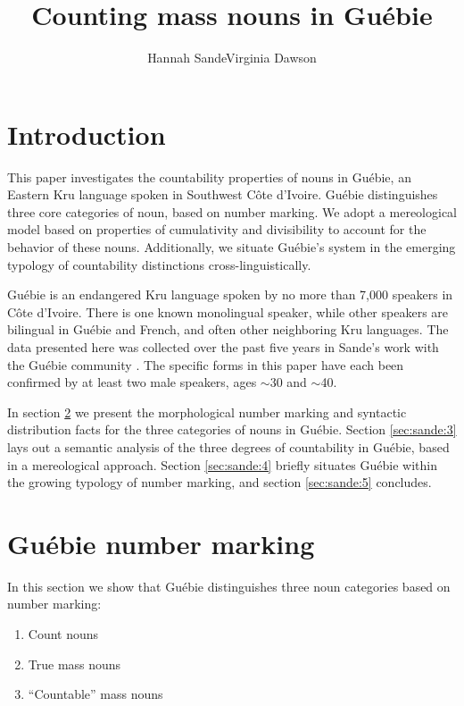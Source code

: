 \documentclass[output=paper,colorlinks,citecolor=brown]{langscibook}
\title{Counting mass nouns in Guébie}
\author{Hannah Sande\affiliation{Georgetown University}\lastand Virginia Dawson\affiliation{University of California, Berkeley}}
\begin{document}
\maketitle 

\section{Introduction}\label{sec:sande:1}

This paper investigates the countability properties of nouns in Guébie, an Eastern Kru language spoken in Southwest Côte d'Ivoire. Guébie distinguishes three core categories of noun, based on number marking. We adopt a mereological model based on properties of cumulativity and divisibility to account for the behavior of these nouns. Additionally, we situate Guébie's system in the emerging typology of countability distinctions cross-linguistically.

Guébie is an endangered Kru language spoken by no more than 7,000 speakers in Côte d'Ivoire. There is one known monolingual speaker, while other speakers are bilingual in Guébie and French, and often other neighboring Kru languages. The data presented here was collected over the past five years in Sande's work with the Guébie community \citep{Sande2017}. The specific forms in this paper have each been confirmed by at least two male speakers, ages $\sim$30 and $\sim$40.

In section \ref{sec:sande:2} we present the morphological number marking and syntactic distribution facts for the three categories of nouns in Guébie. Section \ref{sec:sande:3} lays out a semantic analysis of the three degrees of countability in Guébie, based in a mereological approach. Section \ref{sec:sande:4} briefly situates Guébie within the growing typology of number marking, and section \ref{sec:sande:5} concludes.

\section{Guébie number marking}\label{sec:sande:2}

In this section we show that Guébie distinguishes three noun categories based on number marking:

\begin{enumerate}
	\item Count nouns
	\item True mass nouns
	\item ``Countable'' mass nouns
\end{enumerate}
\end{document}

